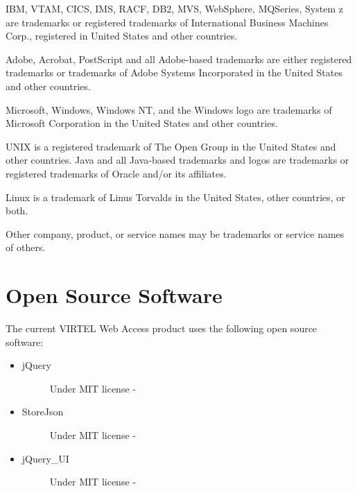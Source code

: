 \documentclass[letterpaper,10pt,english]{sphinxmanual}
\begin{document}
IBM, VTAM, CICS, IMS, RACF, DB2, MVS, WebSphere, MQSeries, System z are trademarks or registered trademarks of
International Business Machines Corp., registered in United States and other countries.

Adobe, Acrobat, PostScript and all Adobe-based trademarks are either registered trademarks or trademarks of Adobe
Systems Incorporated in the United States and other countries.

Microsoft, Windows, Windows NT, and the Windows logo are trademarks of Microsoft Corporation in the United States
and other countries.

UNIX is a registered trademark of The Open Group in the United States and other countries.
Java and all Java-based trademarks and logos are trademarks or registered trademarks of Oracle and/or its affiliates.

Linux is a trademark of Linus Torvalds in the United States, other countries, or both.

Other company, product, or service names may be trademarks or service names of others.


\section{Open Source Software}
\label{\detokenize{Getting_Started:open-source-software}}
The current VIRTEL Web Access product uses the following open source software:
\begin{itemize}
\item {} \begin{description}
\item[{jQuery}] \leavevmode
Under MIT license - 

\end{description}

\item {} \begin{description}
\item[{StoreJson}] \leavevmode
Under MIT license - 

\end{description}

\item {} \begin{description}
\item[{jQuery\_UI}] \leavevmode
Under MIT license - 

\end{description}

\end{itemize}



\renewcommand{\indexname}{Index}
\printindex
\end{document}
